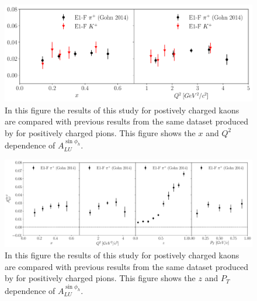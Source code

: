 \begin{figure}
	\centering
	\includegraphics[width=16cm]{image/plots/kaon-bsa/compare-pion-xq2.pdf}
	\caption{In this figure the results of this study for postively charged kaons are compared with previous results from the same dataset produced by \cite{tmds-gohn:2014} for positively charged pions.  This figure shows the $x$ and $Q^2$ dependence of $A_{LU}^{\sin\phi_h}$.}
\end{figure}

\begin{figure}
	\centering
	\includegraphics[width=16cm]{image/plots/kaon-bsa/compare-pion-zpt.pdf}
	\caption{In this figure the results of this study for postively charged kaons are compared with previous results from the same dataset produced by \cite{tmds-gohn:2014} for positively charged pions.  This figure shows the $z$ and $P_T$ dependence of $A_{LU}^{\sin\phi_h}$.}
\end{figure}

